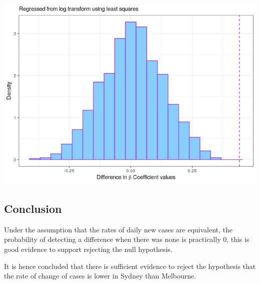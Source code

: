 \documentclass{article}
\begin{document}
\includegraphics{main_files/figure-html/unnamed-chunk-23-1.png}

\hypertarget{conclusion-3}{%
\subsection{Conclusion}\label{conclusion-3}}

Under the assumption that the rates of daily new cases are equivalent,
the probability of detecting a difference when there was none is
practically 0, this is good evidence to support rejecting the null
hypothesis.

It is hence concluded that there is sufficient evidence to reject the
hypothesis that the rate of change of cases is lower in Sydney than
Melbourne.
\end{document}
